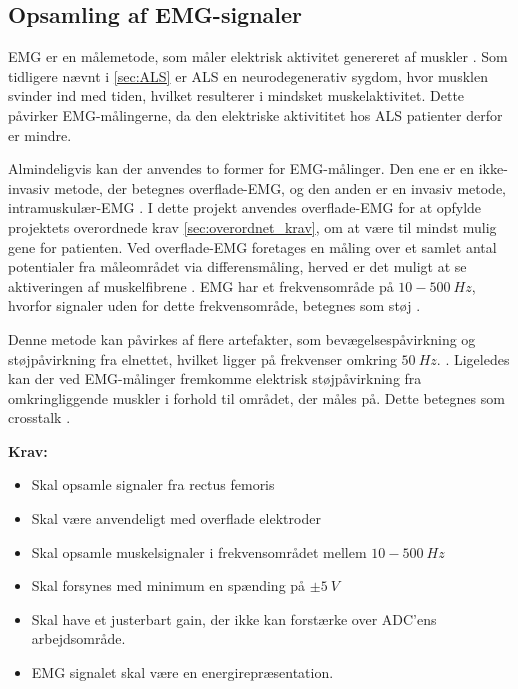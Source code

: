 \subsection{Opsamling af EMG-signaler} \label{sec:EMG_krav}
EMG er en målemetode, som måler elektrisk aktivitet genereret af muskler \citep{chowdhury2013}. 
Som tidligere nævnt i \autoref{sec:ALS} er ALS en neurodegenerativ sygdom, hvor musklen svinder ind med tiden, hvilket resulterer i mindsket muskelaktivitet. Dette påvirker EMG-målingerne, da den elektriske aktivititet hos ALS patienter derfor er mindre.

Almindeligvis kan der anvendes to former for EMG-målinger. Den ene er en ikke-invasiv metode, der betegnes overflade-EMG, og den anden er en invasiv metode, intramuskulær-EMG \citep{chowdhury2013, keenan2012}. I dette projekt anvendes overflade-EMG for at opfylde projektets overordnede krav \autoref{sec:overordnet_krav}, om at være til mindst mulig gene for patienten. Ved overflade-EMG foretages en måling over et samlet antal potentialer fra måleområdet via differensmåling, herved er det muligt at se aktiveringen af muskelfibrene \citep{keenan2012}. EMG har et frekvensområde på $10-500~Hz$, hvorfor signaler uden for dette frekvensområde, betegnes som støj \citep{morre2003, keenan2012}.  

Denne metode kan påvirkes af flere artefakter, som bevægelsespåvirkning og støjpåvirkning fra elnettet, hvilket ligger på frekvenser omkring $50~Hz$. \citep{keenan2012}.
Ligeledes kan der ved EMG-målinger fremkomme elektrisk støjpåvirkning fra omkringliggende muskler i forhold til området, der måles på. Dette betegnes som crosstalk \citep{keenan2012}. 
\vspace{3mm}

\textbf{Krav:}
\begin{itemize}
\item Skal opsamle signaler fra rectus femoris
\item Skal være anvendeligt med overflade elektroder
\item Skal opsamle muskelsignaler i frekvensområdet mellem $10-500~Hz$
\item Skal forsynes med minimum en spænding på $\pm5~V$ 
\item Skal have et justerbart gain, der ikke kan forstærke over ADC'ens arbejdsområde.
\item EMG signalet skal være en energirepræsentation.
\end{itemize}
